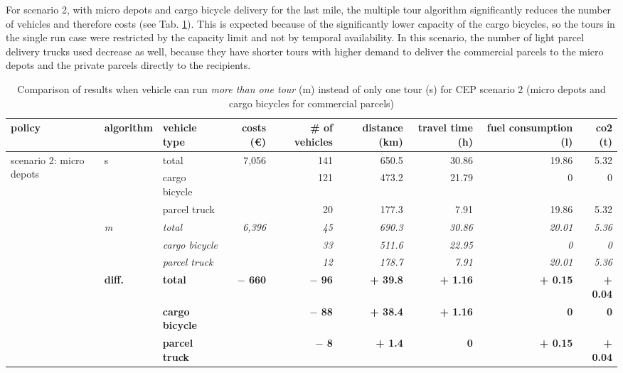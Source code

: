 For scenario 2, with micro depots and cargo bicycle delivery for the last mile, the multiple tour algorithm significantly reduces the number of vehicles and therefore costs (see Tab. \ref{tab:CEP2SinglevsMultiToursData}). This is expected because of the significantly lower capacity of the cargo bicycles, so the tours in the single run case were restricted by the capacity limit and not by temporal availability. In this scenario, the number of light parcel delivery trucks used decrease as well, because they have shorter tours with higher demand to deliver the commercial parcels to the micro depots and the private parcels directly to the recipients.

\begin{table}[b]
\caption{Comparison of results when vehicle can run \textit{more than one tour} (m) instead of only one tour (s) for CEP scenario 2 (micro depots and cargo bicycles for commercial parcels)}
\begin{tabular*}{\hsize}{@{\extracolsep{\fill}}lllrrrrrr@{}}
\toprule
policy &  algorithm & vehicle type & costs (\euro)  & \# of vehicles & distance (km) & travel time (h) & fuel consumption (l) & \gls{co2}  (t)\\
\midrule
\multirow{ 9}{50pt}{scenario 2:  micro depots} & \multirow{3}{*}{s} & total  &  7,056 &  141 & 650.5 &	30.86 & 19.86 & 5.32 \\
&& cargo bicycle & & 121 & 473.2 &	21.79 &  0 & 0\\
&& parcel truck & & 20 & 177.3 & 7.91 & 19.86 & 5.32\\

\cline{2-9}

& \multirow{3}{*}{\textit{m}} & \textit{total} & \textit{6,396}  & \textit{45} & \textit{690.3} & \textit{30.86} & \textit{20.01} & \textit{5.36}\\ 
&& \textit{cargo bicycle} & & \textit{33} & \textit{511.6} & \textit{22.95} & \textit{0} & \textit{0}\\ 
&& \textit{parcel truck} & & \textit{12} & \textit{178.7} & \textit{7.91} & \textit{20.01} & \textit{5.36}\\ 

\cline{2-9}

& \multirow{3}{*}{\textbf{diff.}} & \textbf{total} & \textbf{$-$ 660}  & \textbf{$-$ 96} & \textbf{+ 39.8} & \textbf{+ 1.16} & \textbf{+ 0.15} & \textbf{+ 0.04}\\ 
&& \textbf{cargo bicycle} & & \textbf{$-$ 88} & \textbf{+ 38.4} & \textbf{+ 1.16} & \textbf{0} & \textbf{0}\\ 
&& \textbf{parcel truck} & & \textbf{$-$ 8} & \textbf{+ 1.4} & \textbf{ 0} & \textbf{+ 0.15} & \textbf{+ 0.04}\\

\bottomrule
\end{tabular*}
\label{tab:CEP2SinglevsMultiToursData}
\end{table}

